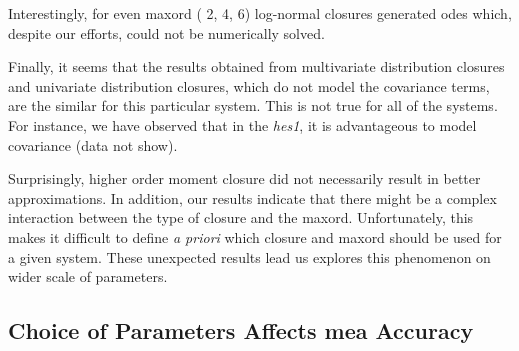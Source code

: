 Interestingly, for even \gls{maxord} (\ie{} 2, 4, 6) log-normal closures generated \gls{ode}s which, despite our efforts, could not be numerically solved.

Finally, it seems that the results obtained from multivariate distribution closures and univariate distribution closures,
 which do not model the covariance terms, are the similar for this particular system.
This is not true for all of the systems.
For instance, we have observed that in the \emph{hes1}, it is advantageous to model covariance (data not show).


Surprisingly, higher order moment closure did not necessarily result in better approximations.
In addition, our results indicate that there might be a complex interaction between the type of closure and the \gls{maxord}.
Unfortunately, this makes it difficult to define \emph{a priori} which closure and \gls{maxord} should be used for a given system.
These unexpected results lead us explores this phenomenon on wider scale of parameters.




\subsection{Choice of Parameters Affects \acrshort{mea} Accuracy}
\label{sec:hit-and-miss}

